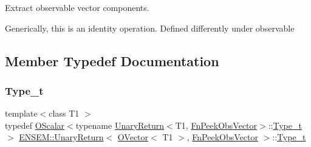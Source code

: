 Extract observable vector components. 

Generically, this is an identity operation. Defined differently under observable 

\subsection{Member Typedef Documentation}
\mbox{\label{structENSEM_1_1UnaryReturn_3_01OVector_3_01T1_01_4_00_01FnPeekObsVector_01_4_a389e8e049203dcaaa7ef75769364c944}} 
\subsubsection{\texorpdfstring{Type\_t}{Type\_t}\hspace{0.1cm}{\footnotesize\ttfamily [1/2]}}
{\footnotesize\ttfamily template$<$class T1 $>$ \\
typedef \mbox{\hyperlink{classENSEM_1_1OScalar}{O\+Scalar}}$<$typename \mbox{\hyperlink{structENSEM_1_1UnaryReturn}{Unary\+Return}}$<$T1, \mbox{\hyperlink{structENSEM_1_1FnPeekObsVector}{Fn\+Peek\+Obs\+Vector}}$>$\+::\mbox{\hyperlink{structENSEM_1_1UnaryReturn_3_01OVector_3_01T1_01_4_00_01FnPeekObsVector_01_4_a389e8e049203dcaaa7ef75769364c944}{Type\+\_\+t}}$>$ \mbox{\hyperlink{structENSEM_1_1UnaryReturn}{E\+N\+S\+E\+M\+::\+Unary\+Return}}$<$ \mbox{\hyperlink{classENSEM_1_1OVector}{O\+Vector}}$<$ T1 $>$, \mbox{\hyperlink{structENSEM_1_1FnPeekObsVector}{Fn\+Peek\+Obs\+Vector}} $>$\+::\mbox{\hyperlink{structENSEM_1_1UnaryReturn_3_01OVector_3_01T1_01_4_00_01FnPeekObsVector_01_4_a389e8e049203dcaaa7ef75769364c944}{Type\+\_\+t}}}

\mbox{\label{structENSEM_1_1UnaryReturn_3_01OVector_3_01T1_01_4_00_01FnPeekObsVector_01_4_a389e8e049203dcaaa7ef75769364c944}} 

